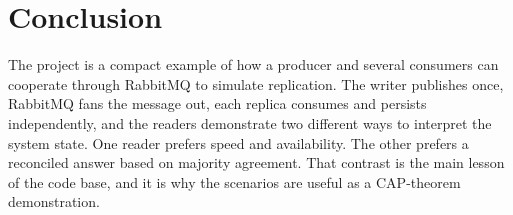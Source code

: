 \documentclass[11pt]{article}
\begin{document}
\section{Conclusion}

The project is a compact example of how a producer and several consumers can cooperate through RabbitMQ to simulate replication. The writer publishes once, RabbitMQ fans the message out, each replica consumes and persists independently, and the readers demonstrate two different ways to interpret the system state. One reader prefers speed and availability. The other prefers a reconciled answer based on majority agreement. That contrast is the main lesson of the code base, and it is why the scenarios are useful as a CAP-theorem demonstration.
\end{document}
